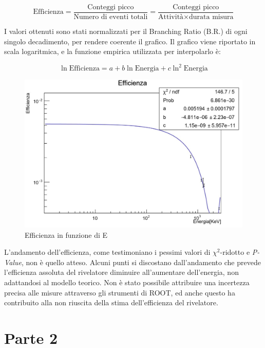 \documentclass[a4paper,10pt]{article}
\begin{document}
\begin{equation}
	\textrm{Efficienza}=\frac{\textrm{Conteggi picco}}{\textrm{Numero di eventi totali}}=\frac{\textrm{Conteggi picco}}{\textrm{Attivit\`a} \times \textrm{durata misura}}
\end{equation}

\noindent I valori ottenuti sono stati normalizzati per il Branching Ratio (B.R.) di ogni singolo decadimento, per rendere coerente il grafico. Il grafico viene riportato in scala logaritmica, e la funzione empirica utilizzata per interpolarlo \`e:

\begin{equation}
	\ln{\textrm{Efficienza}}=a + b\ln{\textrm{Energia}} + c\ln^{2}{\textrm{Energia}}
\end{equation}

\begin{figure}[H]
    \centering
    \includegraphics[scale=0.45]{grafici/efficienzasources}
    \caption{Efficienza in funzione di E}
\end{figure}

\noindent L'andamento dell'efficienza, come testimoniano i pessimi valori di $\chi^2$-ridotto e \textit{P-Value}, non \`e quello atteso. Alcuni punti si discostano dall'andamento che prevede l'efficienza assoluta del rivelatore diminuire all'aumentare dell'energia, non adattandosi al modello teorico. Non \`e stato possibile attribuire una incertezza precisa alle misure attraverso gli strumenti di ROOT, ed anche questo ha contribuito alla non riuscita della stima dell'efficienza del rivelatore.

\section{Parte 2}
\end{document}
